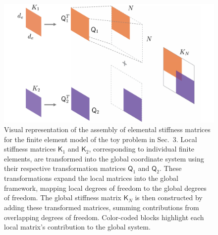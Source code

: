 \documentclass[11pt]{article}
\newcommand{\mat}[1]{\mathsf{#1}}
\begin{document}
\begin{figure}[t]
    \centering
    \includegraphics[width=0.6\linewidth]{K_full.pdf}
    \caption{Visual representation of the assembly of elemental stiffness matrices for the finite element model of the toy problem in Sec.~3. Local stiffness matrices \( \mat{K}_1 \) and \( \mat{K}_2 \), corresponding to individual finite elements, are transformed into the global coordinate system using their respective transformation matrices \( \mat{Q}_1 \) and \( \mat{Q}_2 \). These transformations expand the local matrices into the global framework, mapping local degrees of freedom to the global degrees of freedom. The global stiffness matrix \( \mat{K}_N \) is then constructed by adding these transformed matrices, summing contributions from overlapping degrees of freedom. Color-coded blocks highlight each local matrix's contribution to the global system.}
    \label{fig:visual_FOM_FEA}
\end{figure}
\end{document}
